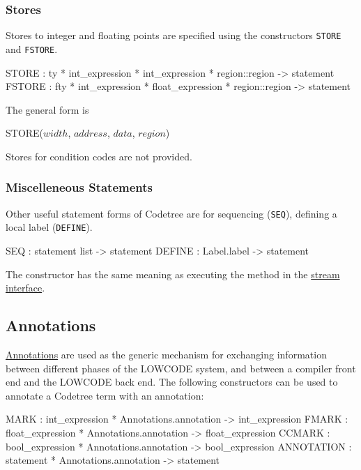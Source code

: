 \subsubsection{Stores}
Stores to integer and floating points are specified using the
constructors \verb|STORE| and \verb|FSTORE|.   
\begin{SML}
   STORE  : ty * int_expression * int_expression * region::region -> statement
   FSTORE : fty * int_expression * float_expression * region::region -> statement
\end{SML}

The general form is
\begin{SML}
   STORE(\(width\), \(address\), \(data\), \(region\))
\end{SML}

Stores for condition codes are not provided.
\subsubsection{Miscelleneous Statements}

Other useful statement forms of Codetree are for sequencing (\verb|SEQ|),
defining a local label (\verb|DEFINE|).
\begin{SML}
   SEQ    : statement list -> statement
   DEFINE : Label.label -> statement
\end{SML}
The constructor  has the same meaning as 
executing the method  in the 
\href{stream.html}{stream interface}.

\subsection{Annotations}
\href{annotations.html}{Annotations} are used as the generic mechanism for
exchanging information between different phases of the LOWCODE system, and
between a compiler front end and the LOWCODE back end.
The following constructors can be used to annotate a Codetree term with
an annotation:
\begin{SML}
   MARK : int_expression * Annotations.annotation -> int_expression
   FMARK : float_expression * Annotations.annotation -> float_expression
   CCMARK : bool_expression * Annotations.annotation -> bool_expression 
   ANNOTATION : statement * Annotations.annotation -> statement
\end{SML}
